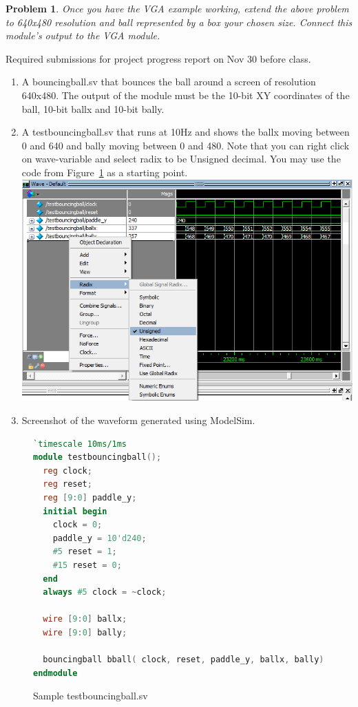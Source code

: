 \documentclass{article}
\newtheorem{prob}{Problem}
\begin{document}
\begin{prob}
  Once you have the VGA example working, extend the above problem to 640x480
  resolution and ball represented by a box your chosen size. Connect this
  module's output to the VGA module.
\end{prob}


{\color{red}
  Required submissions for project progress report on Nov 30 before class.
  \begin{enumerate}
  \item A bouncingball.sv that bounces the ball around a screen of resolution
    640x480. The output of the module must be the 10-bit XY coordinates of the
    ball, 10-bit ballx and 10-bit bally.
  \item A testbouncingball.sv that runs at 10Hz and shows the ballx moving
    between 0 and 640 and bally moving between 0 and 480. Note that you can
    right click on wave-variable and select radix to be Unsigned decimal. You
    may use the code from Figure~\ref{lst:testbouncingball.sv} as a starting point.\\
    \includegraphics[width=\linewidth]{./media/testbouncingball-radix-unsigned.png}
  \item Screenshot of the waveform generated using ModelSim.
  \end{enumerate}
}

\begin{figure}
\begin{lstlisting}[language=verilog]
`timescale 10ms/1ms
module testbouncingball();
  reg clock;
  reg reset;
  reg [9:0] paddle_y;
  initial begin
    clock = 0;
    paddle_y = 10'd240;
    #5 reset = 1;
    #15 reset = 0;
  end
  always #5 clock = ~clock;
    
  wire [9:0] ballx;
  wire [9:0] bally;
  
  bouncingball bball( clock, reset, paddle_y, ballx, bally);
endmodule
\end{lstlisting}
  \caption{Sample testbouncingball.sv}
  \label{lst:testbouncingball.sv}
\end{figure}
\end{document}
